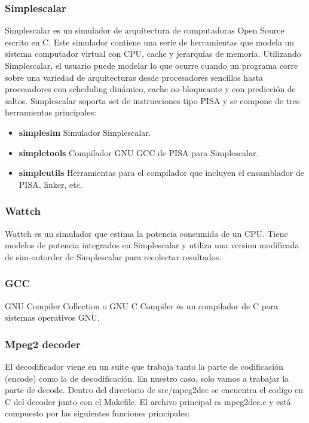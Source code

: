 \documentclass[journal]{IEEEtran}
\begin{document}
\subsubsection{Simplescalar}
Simplescalar\cite{SIMPLESCALAR} es un simulador de arquitectura de computadoras Open Source escrito en C. Este simulador contiene una serie de herramientas que modela un sistema computador virtual con CPU, cache y jerarqu\'{i}as de memoria.
Utilizando Simplescalar, el usuario puede modelar lo que ocurre cuando un programa corre sobre una variedad de arquitecturas desde procesadores sencillos hasta procesadores con scheduling din\'{a}mico, cache no-bloqueante
y con predicci\'{o}n de saltos. Simplescalar soporta set de instrucciones tipo PISA y se compone de tres herramientas principales: \newline

\begin{itemize}
\item \textbf{simplesim} Simulador Simplescalar.
\item \textbf{simpletools} Compilador GNU GCC de PISA para Simplescalar.
\item \textbf{simpleutils} Herramientas para el compilador que incluyen el ensamblador de PISA, linker, etc. \newline
\end{itemize}

\subsubsection{Wattch}
Wattch\cite{WATTCH} es un simulador que estima la potencia consumida de un CPU. Tiene modelos de potencia integrados en Simplescalar y utiliza una version modificada de sim-outorder de Simplescalar para recolectar resultados. \newline

\subsubsection{GCC}
GNU Compiler Collection o GNU C Compiler es un compilador de C para sistemas operativos GNU. \newline

\subsubsection{Mpeg2 decoder}
El decodificador viene en un suite que trabaja tanto la parte de codificaci\'{o}n (encode) como la de decodificaci\'{o}n. En nuestro caso, solo vamos a trabajar la parte de decode.
Dentro del directorio de src/mpeg2dec se encuentra el codigo en C del decoder junto con el Makefile. El archivo principal es mpeg2dec.c y est\'{a} compuesto por las siguientes funciones principales:
\end{document}
